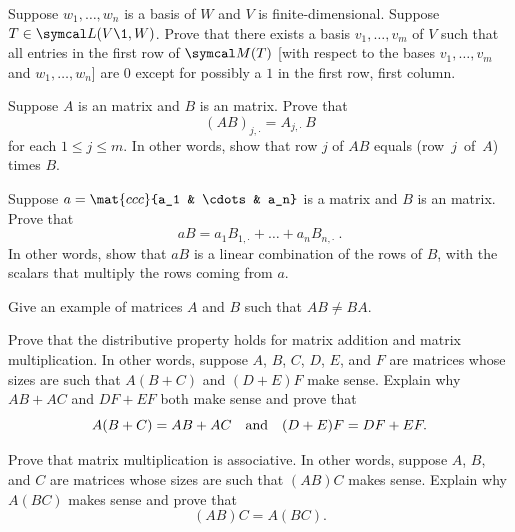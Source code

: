 \begin{exercises}
\exercise
Suppose $w_1, \dots, w_n$ is a basis of $W$ and $V$ is finite-dimensional. Suppose $T \in \L(V\1, W)$. Prove that there exists a basis $v_1, \dots, v_m$ of $V$ such that all entries in the first row of $\M(T)$ [with respect to the bases $v_1, \dots, v_m$ and $w_1, \dots, w_n$] are $0$ except for possibly a $1$ in the first row, first column.


\exercise
Suppose $A$ is an  matrix and $B$ is an  matrix. Prove that \label{3think1}
\[
(AB)_{j,\cdot} = A_{j,\cdot} \, B
\]
for each $1 \le j \le m$. In other words, show that row $j$ of $AB$ equals (row~$j$~of~$A$) times $B$.


\exercise
Suppose $a = \mat{ccc}{a_1 & \cdots & a_n}$ is a  matrix and $B$ is an  matrix. Prove that \label{3think2}
\[
aB = a_1 B_{1, \cdot} + \dots + a_n B_{n, \cdot}\ .
\]
In other words, show that $aB$ is a linear combination of the rows of $B$, with the scalars that multiply the rows coming from $a$.



\exercise
Give an example of  matrices $A$ and $B$ such that $AB \ne BA$. \label{noncommute}


\exercise
Prove that the distributive property holds for matrix addition and matrix
multiplication.  In other words, suppose $A$, $B$, $C$, $D$, $E$, and $F$ are matrices whose
sizes are such that $A(B+C)$ and $(D+E)F$ make sense.  Explain why $AB + AC$ and $DF + EF$ both make sense
and prove that\label{3distrib}
\[
A(B+C) = AB + AC \quad \text{and} \quad (D+E)F = DF + EF.
\]
\exercisedisplayend


\exercise
Prove that matrix multiplication is associative.  In other words, suppose $A$,
$B$, and $C$ are matrices whose sizes are such that $(AB)C$ makes sense.
Explain why $A(BC)$ makes sense and prove that\label{assoc} \[(AB)C = A(BC).\]



\end{exercises}
